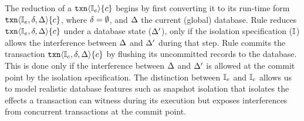 The reduction of a $\ctxn{i}{\I_e}{c}$ begins by first converting it
to its run-time form $\ctxn{i}{\I_e,\stl,\stg}{c}$, where $\stl =
\emptyset$, and $\stg$ the current (global) database.  Rule
 reduces $\ctxn{i}{\I_e,\stl,\stg}{c}$ under a
database state ($\stg'$), only if the isolation specification ($\I$)
allows the interference between $\stg$ and $\stg'$ during that
step. Rule  commits the transaction
$\ctxn{i}{\I_c,\stl,\stg}{c}$ by flushing its uncommitted records to
the database. This is done only if the interference between $\stg$ and
$\stg'$ is allowed at the commit point by the isolation specification.
The distinction between $\I_e$ and $\I_c$ allows us to model realistic
database features such as snapshot isolation that isolates the effects
a transaction can witness during its execution but exposes
interferences from concurrent transactions at the commit point.



